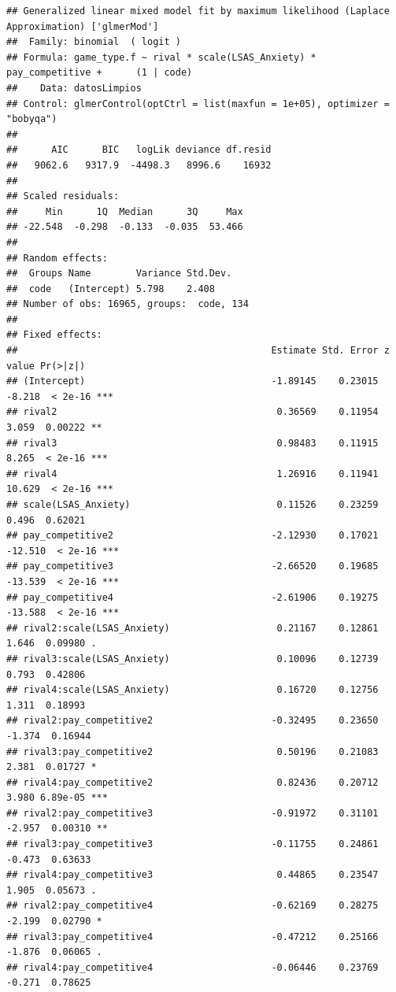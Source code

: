 \documentclass[
]{article}
\begin{document}
\begin{verbatim}
## Generalized linear mixed model fit by maximum likelihood (Laplace Approximation) ['glmerMod']
##  Family: binomial  ( logit )
## Formula: game_type.f ~ rival * scale(LSAS_Anxiety) * pay_competitive +      (1 | code)
##    Data: datosLimpios
## Control: glmerControl(optCtrl = list(maxfun = 1e+05), optimizer = "bobyqa")
## 
##      AIC      BIC   logLik deviance df.resid 
##   9062.6   9317.9  -4498.3   8996.6    16932 
## 
## Scaled residuals: 
##     Min      1Q  Median      3Q     Max 
## -22.548  -0.298  -0.133  -0.035  53.466 
## 
## Random effects:
##  Groups Name        Variance Std.Dev.
##  code   (Intercept) 5.798    2.408   
## Number of obs: 16965, groups:  code, 134
## 
## Fixed effects:
##                                             Estimate Std. Error z value Pr(>|z|)    
## (Intercept)                                 -1.89145    0.23015  -8.218  < 2e-16 ***
## rival2                                       0.36569    0.11954   3.059  0.00222 ** 
## rival3                                       0.98483    0.11915   8.265  < 2e-16 ***
## rival4                                       1.26916    0.11941  10.629  < 2e-16 ***
## scale(LSAS_Anxiety)                          0.11526    0.23259   0.496  0.62021    
## pay_competitive2                            -2.12930    0.17021 -12.510  < 2e-16 ***
## pay_competitive3                            -2.66520    0.19685 -13.539  < 2e-16 ***
## pay_competitive4                            -2.61906    0.19275 -13.588  < 2e-16 ***
## rival2:scale(LSAS_Anxiety)                   0.21167    0.12861   1.646  0.09980 .  
## rival3:scale(LSAS_Anxiety)                   0.10096    0.12739   0.793  0.42806    
## rival4:scale(LSAS_Anxiety)                   0.16720    0.12756   1.311  0.18993    
## rival2:pay_competitive2                     -0.32495    0.23650  -1.374  0.16944    
## rival3:pay_competitive2                      0.50196    0.21083   2.381  0.01727 *  
## rival4:pay_competitive2                      0.82436    0.20712   3.980 6.89e-05 ***
## rival2:pay_competitive3                     -0.91972    0.31101  -2.957  0.00310 ** 
## rival3:pay_competitive3                     -0.11755    0.24861  -0.473  0.63633    
## rival4:pay_competitive3                      0.44865    0.23547   1.905  0.05673 .  
## rival2:pay_competitive4                     -0.62169    0.28275  -2.199  0.02790 *  
## rival3:pay_competitive4                     -0.47212    0.25166  -1.876  0.06065 .  
## rival4:pay_competitive4                     -0.06446    0.23769  -0.271  0.78625    

\end{verbatim}
\end{document}
